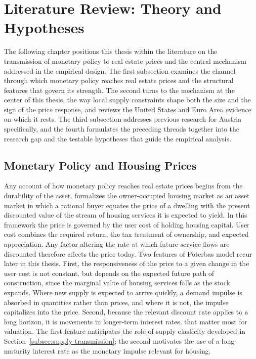 \documentclass[a4paper,12pt, headsepline]{scrartcl}
\numberwithin{equation}{section}
\begin{document}
\section{Literature Review: Theory and Hypotheses}\label{sec:literature}

The following chapter positions this thesis within the literature on the transmission of monetary policy to real estate prices and the central mechanism addressed in the empirical design. The first subsection examines the channel through which monetary policy reaches real estate prices and the structural features that govern its strength. The second turns to the mechanism at the center of this thesis, the way local supply constraints shape both the size and the sign of the price response, and reviews the United States and Euro Area evidence on which it rests. The third subsection addresses previous research for Austria specifically, and the fourth formulates the preceding threads together into the research gap and the testable hypotheses that guide the empirical analysis.

\subsection{Monetary Policy and Housing Prices}\label{subsec:mp-housing}
Any account of how monetary policy reaches real estate prices begins from the durability of the asset. \citet{poterba1984} formalizes the owner-occupied housing market as an asset market in which a rational buyer equates the price of a dwelling with the present discounted value of the stream of housing services it is expected to yield. In this framework the price is governed by the user cost of holding housing capital. User cost combines the required return, the tax treatment of ownership, and expected appreciation. Any factor altering the rate at which future service flows are discounted therefore affects the price today. Two features of Poterbas \citeyearpar{poterba1984} model recur later in this thesis. First, the responsiveness of the price to a given change in the user cost is not constant, but depends on the expected future path of construction, since the marginal value of housing services falls as the stock expands. Where new supply is expected to arrive quickly, a demand impulse is absorbed in quantities rather than prices, and where it is not, the impulse capitalizes into the price. Second, because the relevant discount rate applies to a long horizon, it is movements in longer-term interest rates, that matter most for valuation. The first feature anticipates the role of supply elasticity developed in Section~\ref{subsec:supply-transmission}; the second motivates the use of a long-maturity interest rate as the monetary impulse relevant for housing.
\end{document}
